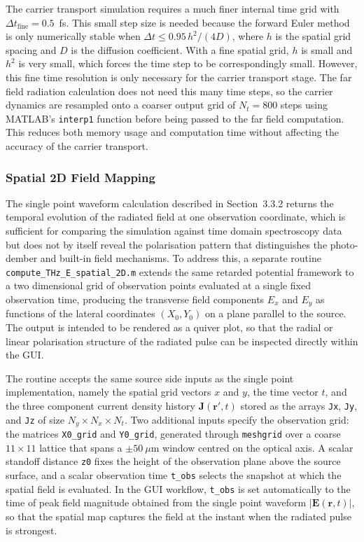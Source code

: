 \documentclass[12pt]{final_project_report}
\begin{document}
The carrier transport simulation requires a much finer internal time grid with $\Delta t_{\mathrm{fine}} = 0.5$~fs. This small step size is needed because the forward Euler method is only numerically stable when $\Delta t \leq 0.95\, h^2/(4D)$, where $h$ is the spatial grid spacing and $D$ is the diffusion coefficient. With a fine spatial grid, $h$ is small and $h^2$ is very small, which forces the time step to be correspondingly small. However, this fine time resolution is only necessary for the carrier transport stage. The far field radiation calculation does not need this many time steps, so the carrier dynamics are resampled onto a coarser output grid of $N_t = 800$ steps using MATLAB's \texttt{interp1} function before being passed to the far field computation. This reduces both memory usage and computation time without affecting the accuracy of the carrier transport.

\subsubsection{Spatial 2D Field Mapping}
The single point waveform calculation described in Section~3.3.2 returns the temporal evolution of the radiated field at one observation coordinate, which is sufficient for comparing the simulation against time domain spectroscopy data but does not by itself reveal the polarisation pattern that distinguishes the photo-dember and built-in field mechanisms. To address this, a separate routine \texttt{compute\_THz\_E\_spatial\_2D.m} extends the same retarded potential framework to a two dimensional grid of observation points evaluated at a single fixed observation time, producing the transverse field components $E_x$ and $E_y$ as functions of the lateral coordinates $(X_0, Y_0)$ on a plane parallel to the source. The output is intended to be rendered as a quiver plot, so that the radial or linear polarisation structure of the radiated pulse can be inspected directly within the GUI.

The routine accepts the same source side inputs as the single point implementation, namely the spatial grid vectors $x$ and $y$, the time vector $t$, and the three component current density history $\mathbf{J}(\mathbf{r}', t)$ stored as the arrays \texttt{Jx}, \texttt{Jy}, and \texttt{Jz} of size $N_y \times N_x \times N_t$. Two additional inputs specify the observation grid: the matrices \texttt{X0\_grid} and \texttt{Y0\_grid}, generated through \texttt{meshgrid} over a coarse $11 \times 11$ lattice that spans a $\pm 50~\mu\mathrm{m}$ window centred on the optical axis. A scalar standoff distance \texttt{z0} fixes the height of the observation plane above the source surface, and a scalar observation time \texttt{t\_obs} selects the snapshot at which the spatial field is evaluated. In the GUI workflow, \texttt{t\_obs} is set automatically to the time of peak field magnitude obtained from the single point waveform $|\mathbf{E}(\mathbf{r}, t)|$, so that the spatial map captures the field at the instant when the radiated pulse is strongest.
\end{document}
